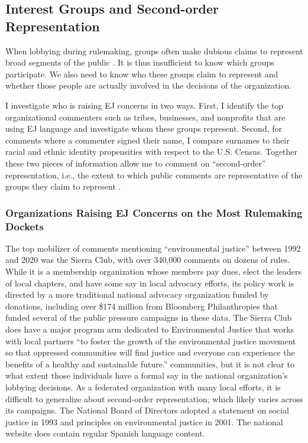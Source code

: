 \documentclass[
      12pt,
        ]{article}
\begin{document}
\hypertarget{interest-groups-and-second-order-representation}{%
\subsection{Interest Groups and Second-order Representation}\label{interest-groups-and-second-order-representation}}

When lobbying during rulemaking, groups often
make dubious claims to represent broad segments of the public \citep{Seifter2016UCLA}. It is thus insufficient to know which groups participate. We
also need to know who these groups claim to represent and whether those people are actually involved in the decisions of the organization.

I investigate who is raising EJ concerns in two ways.
First, I identify the top organizational commenters such as tribes,
businesses, and nonprofits that are using EJ language
and investigate whom these groups represent. Second, for comments where a
commenter signed their name, I compare surnames to their racial and ethnic
identity propensities with respect to the U.S. Census. Together these
two pieces of information allow me to comment on ``second-order'' representation, i.e., the extent to which public comments are
representative of the groups they claim to represent \citep{Seifter2016UCLA}.

\hypertarget{organizations-raising-ej-concerns-on-the-most-rulemaking-dockets}{%
\subsubsection{Organizations Raising EJ Concerns on the Most Rulemaking Dockets}\label{organizations-raising-ej-concerns-on-the-most-rulemaking-dockets}}

The top mobilizer of comments mentioning ``environmental justice'' between 1992 and 2020 was the Sierra Club, with over 340,000 comments on dozens of rules. While it is a membership organization whose members pay dues, elect the leaders of local chapters, and have some say in local advocacy efforts, its policy work is directed by a more traditional national advocacy organization funded by donations, including over \$174 million from Bloomberg Philanthropies that funded several of the public pressure campaigns in these data. The Sierra Club does have a major program arm dedicated to Environmental Justice that works with local partners ``to foster the growth of the environmental justice movement so that oppressed communities will find justice and everyone can experience the benefits of a healthy and sustainable future.'' communities, but it is not clear to what extent those individuals have a formal say in the national organization's lobbying decisions. As a federated organization with many local efforts, it is difficult to generalize about second-order representation, which likely varies across its campaigns. The National Board of Directors adopted a statement on social justice in 1993 and principles on environmental justice in 2001. The national website does contain regular Spanish language content.
\end{document}
